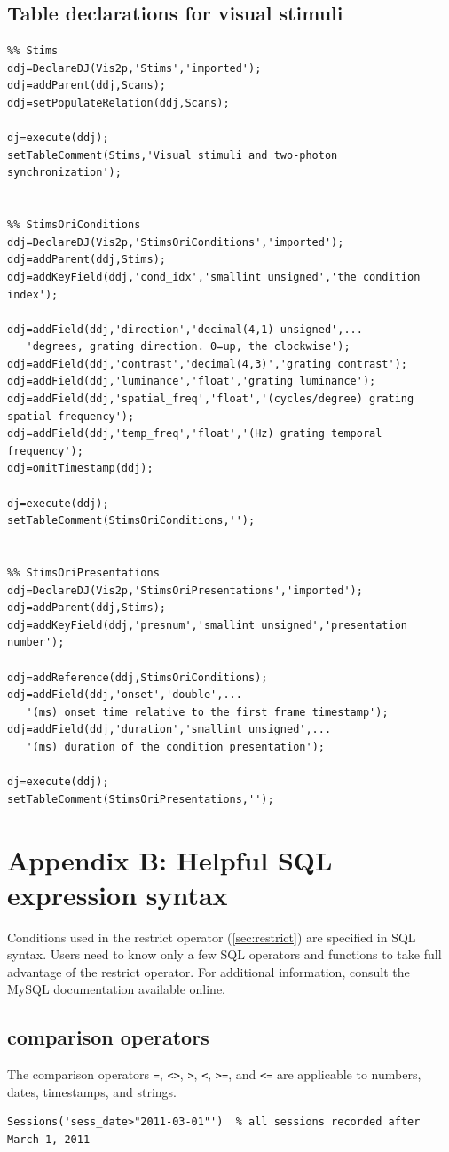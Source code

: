 \documentclass[10pt]{article}
\begin{document}
\subsection{Table declarations for visual stimuli}\label{sec:stims}
\begin{lstlisting}
%% Stims
ddj=DeclareDJ(Vis2p,'Stims','imported');
ddj=addParent(ddj,Scans);
ddj=setPopulateRelation(ddj,Scans);

dj=execute(ddj);
setTableComment(Stims,'Visual stimuli and two-photon synchronization');


%% StimsOriConditions
ddj=DeclareDJ(Vis2p,'StimsOriConditions','imported');
ddj=addParent(ddj,Stims);
ddj=addKeyField(ddj,'cond_idx','smallint unsigned','the condition index');

ddj=addField(ddj,'direction','decimal(4,1) unsigned',...
   'degrees, grating direction. 0=up, the clockwise');
ddj=addField(ddj,'contrast','decimal(4,3)','grating contrast');
ddj=addField(ddj,'luminance','float','grating luminance');
ddj=addField(ddj,'spatial_freq','float','(cycles/degree) grating spatial frequency');
ddj=addField(ddj,'temp_freq','float','(Hz) grating temporal frequency');
ddj=omitTimestamp(ddj);

dj=execute(ddj);
setTableComment(StimsOriConditions,'');


%% StimsOriPresentations
ddj=DeclareDJ(Vis2p,'StimsOriPresentations','imported');
ddj=addParent(ddj,Stims);
ddj=addKeyField(ddj,'presnum','smallint unsigned','presentation number');

ddj=addReference(ddj,StimsOriConditions);
ddj=addField(ddj,'onset','double',...
   '(ms) onset time relative to the first frame timestamp');
ddj=addField(ddj,'duration','smallint unsigned',...
   '(ms) duration of the condition presentation');

dj=execute(ddj);
setTableComment(StimsOriPresentations,'');
\end{lstlisting}

\newpage\section{Appendix B: Helpful SQL expression syntax}\label{sec:sql}
Conditions used in the restrict operator (\autoref{sec:restrict}) are specified in SQL syntax. Users need to know only a few SQL operators and functions to take full advantage of the restrict operator.  For additional information, consult the MySQL documentation available online. 
\subsection{comparison operators}
The comparison operators {\tt =}, {\tt <>}, {\tt >}, {\tt <}, {\tt >=}, and {\tt <=} are applicable to numbers, dates, timestamps, and strings. 
\begin{lstlisting}
Sessions('sess_date>"2011-03-01"')  % all sessions recorded after March 1, 2011
\end{lstlisting}
\end{document}

